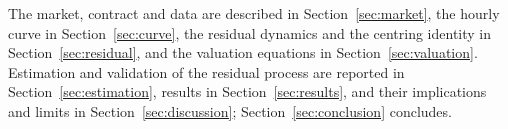 The market, contract and data are described in Section~\ref{sec:market}, the
hourly curve in Section~\ref{sec:curve}, the residual dynamics and the
centring identity in Section~\ref{sec:residual}, and the valuation equations in
Section~\ref{sec:valuation}. Estimation and validation of the residual process
are reported in Section~\ref{sec:estimation}, results in
Section~\ref{sec:results}, and their implications and limits in
Section~\ref{sec:discussion}; Section~\ref{sec:conclusion} concludes.
